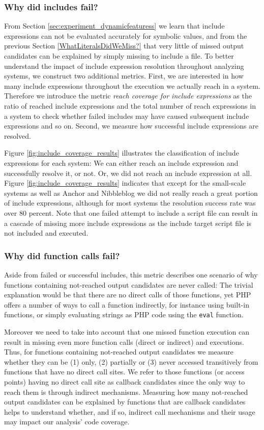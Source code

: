 \documentclass[sigconf]{acmart}
\renewcommand{\sf}[1]{\textsf{#1}}
\begin{document}
\subsubsection{Why did includes fail?}
\label{WhyDidIncludesFail}
From Section \ref{sec:experiment_dynamicfeaturess} we learn that include
expressions can not be evaluated accurately for symbolic values, and from the
previous Section \ref{WhatLiteralsDidWeMiss?} that very little of missed output
candidates can be explained by simply missing to include a file. To better
understand the impact of include expression resolution throughout analyzing
systems, we construct two additional metrics. First, we are interested in how
many include expressions throughout the execution we actually reach in a system.
Therefore we introduce the metric \emph{reach coverage for include expressions}
as the ratio of reached include expressions and the total number of reach
expressions in a system to check whether failed includes may have caused
subsequent include expressions and so on. Second, we measure how successful
include expressions are resolved. 

Figure \ref{fig:include_coverage_results} illustrates the classification of
include expressions for each system: We can either reach an include expression
and successfully resolve it, or not. Or, we did not reach an include expression at all. 
Figure \ref{fig:include_coverage_results} indicates that except for the
small-scale systems as well as \sf{Anchor} and \sf{Nibbleblog} we did not really
reach a great portion of include expressions, although for most systems the
resolution success rate was over 80 percent. Note that one failed attempt
to include a script file can result in a cascade of missing more include
expressions as the include target script file is not included and executed.

\subsubsection{Why did function calls fail?}
\label{WhyDidFunctionCallsFail}
Aside from failed or successful includes, this metric describes one scenario of
why functions containing not-reached output candidates are never called: The
trivial explanation would be that there are no direct calls of those functions,
yet PHP offers a number of ways to call a function indirectly, for instance
using built-in functions, or simply evaluating strings as PHP code using the
\texttt{eval} function.

Moreover we need to take into account that one missed function execution can
result in missing even more function calls (direct or indirect) and executions.
Thus, for functions containing not-reached output candidates we measure whether
they can be (1) only, (2) partially or (3) never accessed transitively from
functions that have no direct call sites. We refer to those functions (or
access points) having no direct call site as callback candidates since the only
way to reach them is through indirect mechanisms. Measuring how many
not-reached output candidates can be explained by functions that are callback
candidates helps to understand whether, and if so, indirect call mechanisms and
their usage may impact our analysis’ code coverage.
\end{document}
